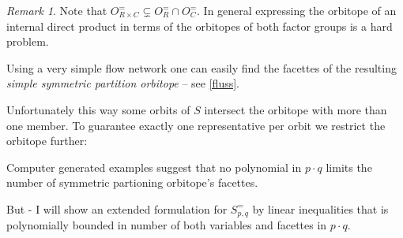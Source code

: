 \documentclass[a4paper]{amsart}
\theoremstyle{definition}
\theoremstyle{remark}
\newtheorem{remark}[theorem]{Remark}
\newcommand{\M}{\ensuremath{\mathcal{M}}}
\begin{document}
\begin{remark}
  Note that \(O^=_{R \times C} \subsetneq O^=_{R} \cap O^=_{C}\).  In
  general expressing the orbitope of an internal direct product in
  terms of the orbitopes of both factor groups is a hard problem.
\end{remark}




Using a very simple flow network one can easily find the facettes of
the resulting \textit{simple symmetric partition orbitope} -- see
\ref{fluss}.


Unfortunately this way some orbits of $S$ intersect the orbitope with
more than one member.  To guarantee exactly one representative per
orbit we restrict the orbitope further:


Computer generated examples suggest that no polynomial in \(p \cdot
q\) limits the number of  symmetric partioning orbitope's
facettes.

But - I will show an extended formulation for \(S^=_{p, q}\) by linear
inequalities that is polynomially bounded in number of both variables
and facettes in \(p \cdot q\).



\end{document}
